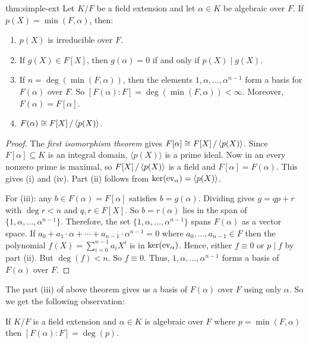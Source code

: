 \begin{Theorem}{}{thm:simple-ext}
  Let $K/F$ be a field extension and let $\alpha\in K$ be algebraic over $F$. 
  If $p(X)=\min(F,\alpha)$, then:
  \begin{enumerate}[label=\textup{(\roman*)}]
    \item $p(X)$ is irreducible over $F$.
    \item If $g(X)\in F[X]$, then $g(\alpha)=0$ if and only if $p(X)\mid g(X)$.
    \item If $n=\deg(\min(F,\alpha))$, then the elements $1,\alpha,\ldots,\alpha^{n-1}$ form a basis for $F(\alpha)$ over $F$. 
    So $[F(\alpha)\colon F]=\deg(\min(F,\alpha))<\infty$. Moreover, $F(\alpha)=F[\alpha]$.
    \item $F(\alpha)\cong \quotient{F[X]}{\la p(X)\ra}$.
  \end{enumerate}
\end{Theorem}
\begin{proof}
  The \emph{first isomorphism theorem} gives $F[\alpha]\cong \quotient{F[X]}{\la p(X)\ra}$. 
  Since $F[\alpha]\subseteq K$ is an integral domain, $\langle p(X)\rangle$ is a prime ideal. 
  Now in an \pid every nonzero prime is maximal, so $\quotient{F[X]}{\la p(X)\ra}$ is a field and $F[\alpha]=F(\alpha)$. 
  This gives (i) and (iv).  
  Part (ii) follows from $\ker(\operatorname{ev}_\alpha)=\langle p(X)\rangle$.

  For (iii): any $b\in F(\alpha)=F[\alpha]$ satisfies $b=g(\alpha)$. 
  Dividing gives $g=qp+r$ with $\deg r<n$ and $q,r\in F[X]$. 
  So $b=r(\alpha)$ lies in the span of $\{1,\alpha,\ldots,\alpha^{n-1}\}$. 
  Therefore, the set $\{1,\alpha,\dots, \alpha^{n-1}\}$ spans $F(\alpha)$ as a vector space. 
  If $a_0+a_1\cdot \alpha+\cdots +a_{n-1}\cdot \alpha^{n-1}=0$ where $a_0,\dots, a_{n-1}\in F$ then the polynomial $f(X)=\sum_{i=0}^{n-1}a_iX^i$ is in $\ker(\operatorname{ev}_\alpha)$. 
  Hence, either $f\equiv 0$ or $p\mid f$ by part (ii). 
  But $\deg(f)<n$. 
  So $f\equiv 0$. 
  Thus, $1,\alpha,\dots, \alpha^{n-1}$ forms a basis of $F(\alpha)$ over $F$. 
\end{proof}

The part (iii) of above theorem gives us a basis of $F(\alpha)$ over $F$ using only $\alpha$. 
So we get the following observation:
\begin{observation}
  If $K/F$ is a field extension and $\alpha\in K$ is algebraic over $F$ where $p=\min(F,\alpha)$ then $[F(\alpha)\colon F]=\deg(p)$. 
\end{observation}

